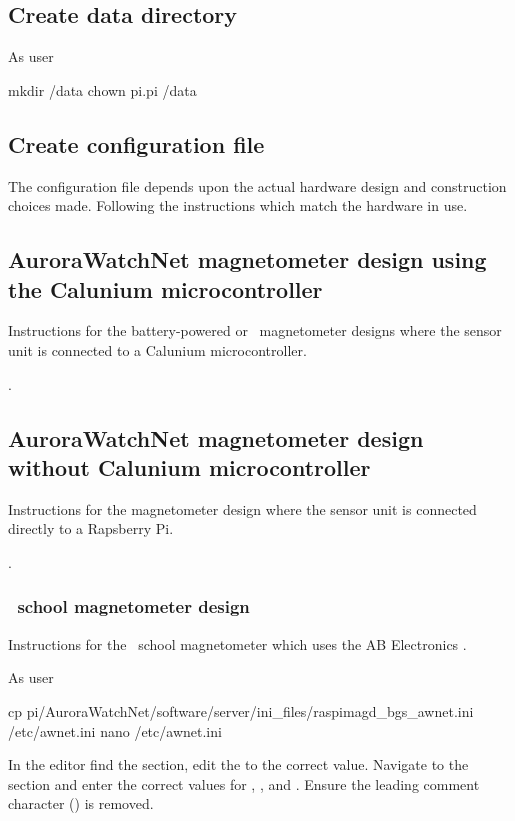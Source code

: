 \subsection{Create data directory}
As user \rootUser
\begin{Cmd}
mkdir /data
chown pi.pi /data
\end{Cmd}

\subsection{Create configuration file}

The configuration file depends upon the actual hardware design and
construction choices made. Following the instructions which match the
hardware in use.

\subsection{AuroraWatchNet magnetometer design using the Calunium
  microcontroller}
Instructions for the battery-powered or \PoE\ magnetometer designs
where the sensor unit is connected to a Calunium microcontroller.

\todo.

\subsection{AuroraWatchNet magnetometer design without Calunium
  microcontroller}
Instructions for the magnetometer design where the sensor unit is
connected directly to a Rapsberry Pi.

\todo.

\subsubsection[BGS school magnetometer design]{\protect\bgs\ school magnetometer design}

Instructions for the \bgs\ school magnetometer which uses the
AB Electronics \adc.

As user \rootUser
\begin{Cmd}[fontsize=\relsize{-1.75}]
cp \mytilde{}pi/AuroraWatchNet/software/server/ini_files/raspimagd_bgs_awnet.ini  /etc/awnet.ini
nano /etc/awnet.ini
\end{Cmd}
In the editor find the \code{[DEFAULT]} section, edit the 
to the correct value. Navigate to the \code{[upload]} section and
enter the correct values for , ,
 and . Ensure the leading comment character
(\code{\#}) is removed.


